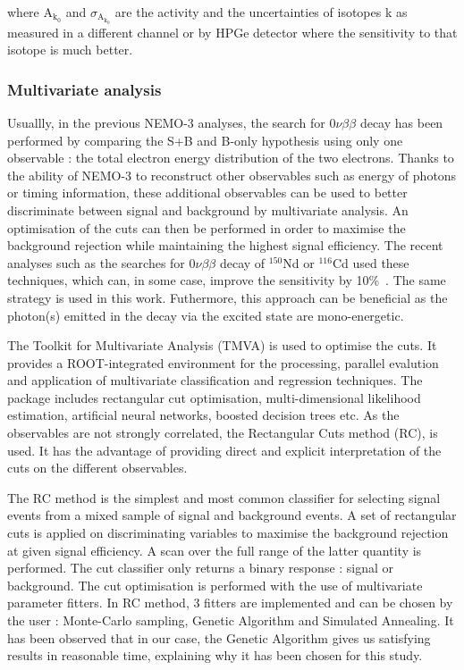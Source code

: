 \documentclass[main.tex]{subfiles}
\begin{document}
\bigskip


\NI where A$_{\text{k}_\text{0}}$ and $\sigma_{\text{A}_{\text{k}_\text{0}}}$ are the activity and the uncertainties of isotopes k as measured in a different channel or by HPGe detector where the sensitivity to that isotope is much better.


\subsubsection{Multivariate analysis}


\NI Usuallly, in the previous NEMO-3 analyses, the search for 0$\nu\beta\beta$ decay has been performed by comparing the S+B and B-only hypothesis using only one observable : the total electron energy distribution of the two electrons. Thanks to the ability of NEMO-3 to reconstruct other observables such as energy of photons or timing information, these additional observables can be used to better discriminate between signal and background by multivariate analysis. An optimisation of the cuts can then be performed in order to maximise the background rejection while maintaining the highest signal efficiency. The recent analyses such as the searches for 0$\nu\beta\beta$ decay of $^{\text{150}}$Nd or $^{\text{116}}$Cd used these techniques, which can, in some case, improve the sensitivity by 10\%~\cite{NEMO3:Nd150}. The same strategy is used in this work. Futhermore, this approach can be beneficial as the photon(s) emitted in the decay via the excited state are mono-energetic.


\bigskip


\NI The Toolkit for Multivariate Analysis (TMVA) is used to optimise the cuts. It provides a ROOT-integrated environment for the processing, parallel evalution and application of multivariate classification and regression techniques. The package includes rectangular cut optimisation, multi-dimensional likelihood estimation, artificial neural networks, boosted decision trees etc. As the observables are not strongly correlated, the Rectangular Cuts method (RC), is used. It has the advantage of providing direct and explicit interpretation of the cuts on the different observables.


\bigskip


\NI The RC method is the simplest and most common classifier for selecting signal events from a mixed sample of signal and background events. A set of rectangular cuts is applied on discriminating variables to maximise the background rejection at given signal efficiency. A scan over the full range of the latter quantity is performed. The cut classifier only returns a binary response : signal or background. The cut optimisation is performed with the use of multivariate parameter fitters. In RC method, 3 fitters are implemented and can be chosen by the user : Monte-Carlo sampling, Genetic Algorithm and Simulated Annealing. It has been observed that in our case, the Genetic Algorithm gives us satisfying results in reasonable time, explaining why it has been chosen for this study.
\end{document}
